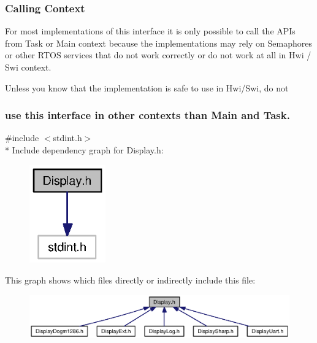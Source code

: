 \subsubsection*{Calling Context}

For most implementations of this interface it is only possible to call the A\+P\+Is from Task or Main context because the implementations may rely on Semaphores or other R\+T\+O\+S services that do not work correctly or do not work at all in Hwi / Swi context.

Unless you know that the implementation is safe to use in Hwi/\+Swi, do not \subsubsection*{use this interface in other contexts than Main and Task. }{\ttfamily \#include $<$stdint.\+h$>$}\\*
Include dependency graph for Display.\+h\+:
\nopagebreak
\begin{figure}[H]
\begin{center}
\leavevmode
\includegraphics[width=93pt]{_display_8h__incl}
\end{center}
\end{figure}
This graph shows which files directly or indirectly include this file\+:
\nopagebreak
\begin{figure}[H]
\begin{center}
\leavevmode
\includegraphics[width=350pt]{_display_8h__dep__incl}
\end{center}
\end{figure}
